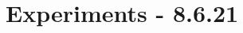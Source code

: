 \documentclass[letterpaper]{article}
\theoremstyle{definition}
\begin{document}
\section{Experiments - 8.6.21} \label{sec:experiment}

%		
%		
%		
\end{document}

